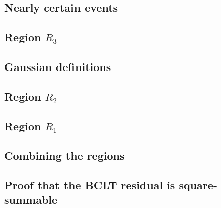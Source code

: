 \subsection{Nearly certain events}



\subsection{Region $R_3$}


\subsection{Gaussian definitions}


\subsection{Region $R_2$}


\subsection{Region $R_1$}


\subsection{Combining the regions}


\subsection{Proof that the BCLT residual is square-summable}

